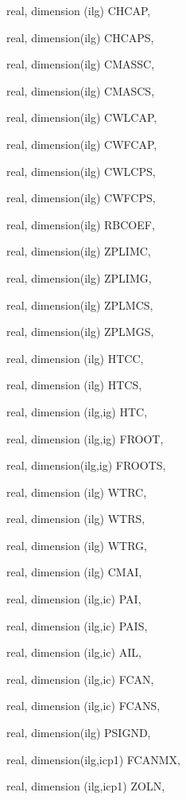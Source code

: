 {\begin{DoxyParamCaption}
\item[{real, dimension (ilg)}]{C\+H\+C\+A\+P, }
\item[{real, dimension(ilg)}]{C\+H\+C\+A\+P\+S, }
\item[{real, dimension(ilg)}]{C\+M\+A\+S\+S\+C, }
\item[{real, dimension(ilg)}]{C\+M\+A\+S\+C\+S, }
\item[{real, dimension(ilg)}]{C\+W\+L\+C\+A\+P, }
\item[{real, dimension(ilg)}]{C\+W\+F\+C\+A\+P, }
\item[{real, dimension(ilg)}]{C\+W\+L\+C\+P\+S, }
\item[{real, dimension(ilg)}]{C\+W\+F\+C\+P\+S, }
\item[{real, dimension(ilg)}]{R\+B\+C\+O\+E\+F, }
\item[{real, dimension(ilg)}]{Z\+P\+L\+I\+M\+C, }
\item[{real, dimension(ilg)}]{Z\+P\+L\+I\+M\+G, }
\item[{real, dimension(ilg)}]{Z\+P\+L\+M\+C\+S, }
\item[{real, dimension(ilg)}]{Z\+P\+L\+M\+G\+S, }
\item[{real, dimension  (ilg)}]{H\+T\+C\+C, }
\item[{real, dimension  (ilg)}]{H\+T\+C\+S, }
\item[{real, dimension   (ilg,ig)}]{H\+T\+C, }
\item[{real, dimension (ilg,ig)}]{F\+R\+O\+O\+T, }
\item[{real, dimension(ilg,ig)}]{F\+R\+O\+O\+T\+S, }
\item[{real, dimension  (ilg)}]{W\+T\+R\+C, }
\item[{real, dimension  (ilg)}]{W\+T\+R\+S, }
\item[{real, dimension  (ilg)}]{W\+T\+R\+G, }
\item[{real, dimension  (ilg)}]{C\+M\+A\+I, }
\item[{real, dimension   (ilg,ic)}]{P\+A\+I, }
\item[{real, dimension  (ilg,ic)}]{P\+A\+I\+S, }
\item[{real, dimension   (ilg,ic)}]{A\+I\+L, }
\item[{real, dimension  (ilg,ic)}]{F\+C\+A\+N, }
\item[{real, dimension (ilg,ic)}]{F\+C\+A\+N\+S, }
\item[{real, dimension(ilg)}]{P\+S\+I\+G\+N\+D, }
\item[{real, dimension(ilg,icp1)}]{F\+C\+A\+N\+M\+X, }
\item[{real, dimension  (ilg,icp1)}]{Z\+O\+L\+N, }

\end{DoxyParamCaption}}
